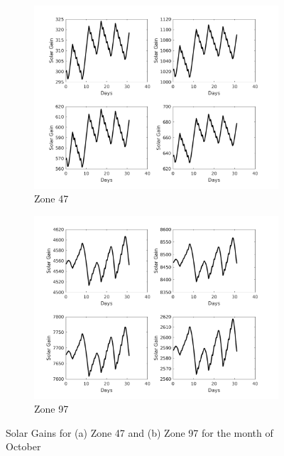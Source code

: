 \begin{figure}[H]
\begin{subfigure}{0.45\textwidth}
\centering
\includegraphics[width=\textwidth]{jbs_figures/solar_2_10}
\caption{Zone 47}
\label{solar_2_10}
\end{subfigure}
\centering
\begin{subfigure}{0.45\textwidth}
\includegraphics[width=\textwidth]{jbs_figures/solar_3_10}
\caption{Zone 97}
\label{solar_3_10}
\end{subfigure} 
\caption{Solar Gains for (a) Zone 47 and (b) Zone 97 for the month of October}
\label{Zone_solar_temperature_oct}
\end{figure}

